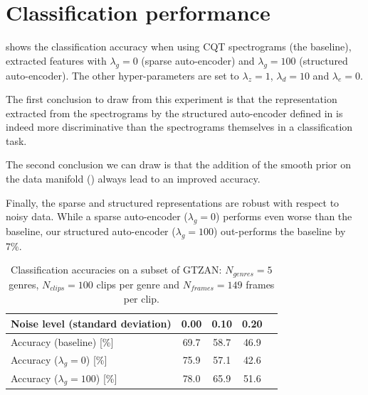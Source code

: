 
\section{Classification performance}

 shows the classification accuracy when using \gls{CQT} spectrograms (the baseline), extracted features with $\lambda_g=0$ (sparse auto-encoder) and $\lambda_g=100$ (structured auto-encoder). The other hyper-parameters are set to $\lambda_z=1$, $\lambda_d=10$ and $\lambda_e=0$.

The first conclusion to draw from this experiment is that the representation extracted from the spectrograms by the structured auto-encoder defined in  is indeed more discriminative than the spectrograms themselves in a classification task.

The second conclusion we can draw is that the addition of the smooth prior on the data manifold () always lead to an improved accuracy.

Finally, the sparse and structured representations are robust with respect to noisy data. While a sparse auto-encoder ($\lambda_g=0$) performs even worse than the baseline, our structured auto-encoder ($\lambda_g=100$) out-performs the baseline by 7\%.

\begin {table}[H]
\begin{center}
	\begin{tabular}{|l|c|c|c|c|}
		\hline
		Noise level (standard deviation)  & 0.00 & 0.10 & 0.20 \\
		\hline
		Accuracy (baseline) [\%]          & 69.7 & 58.7 & 46.9 \\
		Accuracy ($\lambda_g=0$) [\%]     & 75.9 & 57.1 & 42.6 \\
		Accuracy ($\lambda_g=100$) [\%]   & 78.0 & 65.9 & 51.6 \\
		\hline
	\end{tabular}
	\caption{Classification accuracies on a subset of GTZAN: $N_{genres} = 5$ genres, $N_{clips} = 100$ clips per genre and $N_{frames} = 149$ frames per clip.}
	\label{tab:classification_accuracy}
\end{center}
\end{table}

